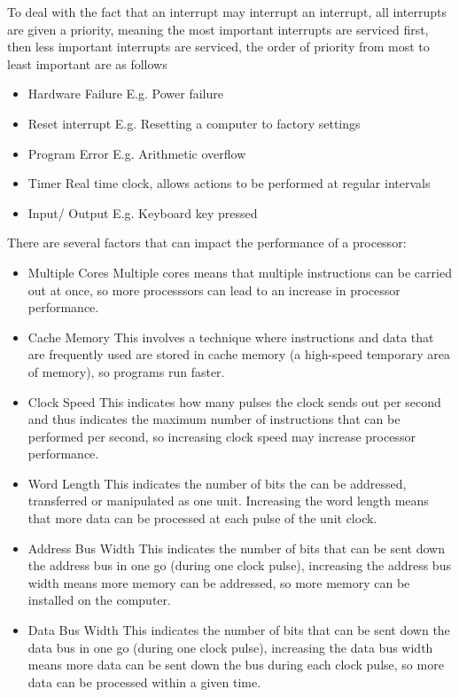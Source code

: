   To deal with the fact that an interrupt may interrupt an interrupt, all interrupts are given a priority, meaning the most important interrupts are serviced first, then less important interrupts are serviced, the order of priority from most to least important are as follows
  \begin{itemize}
  	\item Hardware Failure
	  	\subitem E.g. Power failure
  	\item Reset interrupt
	  	\subitem E.g. Resetting a computer to factory settings
  	\item Program Error
	  	\subitem E.g. Arithmetic overflow
  	\item Timer
	  	\subitem Real time clock, allows actions to be performed at regular intervals
  	\item Input/ Output
	  	\subitem E.g. Keyboard key pressed
  \end{itemize}
  
  \noindent
  There are several factors that can impact the performance of a processor:
  \begin{itemize}
    \setlength{\itemsep}{0em}
    \item Multiple Cores
      \subitem Multiple cores means that multiple instructions can be carried out at once, so more processsors can lead to an increase in processor performance.
    \item Cache Memory
      \subitem This involves a technique where instructions and data that are frequently used are stored in cache memory (a high-speed temporary area of memory), so programs run faster.
    \item Clock Speed
      \subitem This indicates how many pulses the clock sends out per second and thus indicates the maximum number of instructions that can be performed per second, so increasing clock speed may increase processor performance.
    \item Word Length
      \subitem This indicates the number of bits the can be addressed, transferred or manipulated as one unit. Increasing the word length means that more data can be processed at each pulse of the unit clock.
    \item Address Bus Width
      \subitem This indicates the number of bits that can be sent down the address bus in one go (during one clock pulse), increasing the address bus width means more memory can be addressed, so more memory can be installed on the computer.
    \item Data Bus Width
      \subitem This indicates the number of bits that can be sent down the data bus in one go (during one clock pulse), increasing the data bus width means more data can be sent down the bus during each clock pulse, so more data can be processed within a given time.
  \end{itemize}
